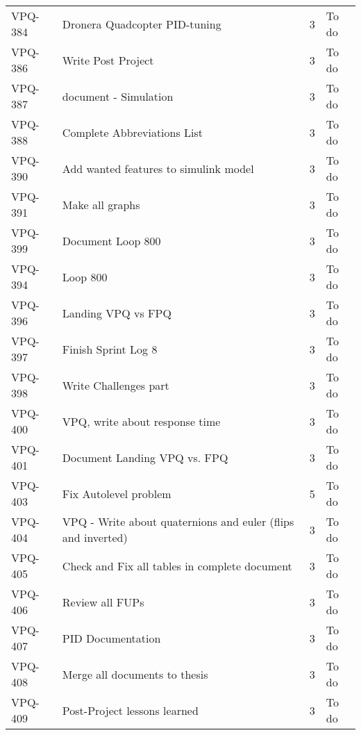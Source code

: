 \begin{table}[ht]
\begin{tabularx}{\linewidth}{|m{1.5cm} m{8.3cm} m{1.5cm} m{3.5cm}|}
      VPQ-384 & Dronera Quadcopter PID-tuning & 3\centering & To do  \\
\rowcolor{gainsboro}  VPQ-386 & Write Post Project & 3\centering & To do  \\
      VPQ-387 & document - Simulation & 3\centering & To do  \\
\rowcolor{gainsboro}  VPQ-388 & Complete Abbreviations List & 3\centering & To do  \\
      VPQ-390 & Add wanted features to simulink model & 3\centering & To do  \\
\rowcolor{gainsboro}  VPQ-391 & Make all graphs & 3\centering & To do  \\
      VPQ-399 & Document Loop 800 & 3\centering & To do  \\
\rowcolor{gainsboro}  VPQ-394 & Loop 800 & 3\centering & To do  \\
      VPQ-396 & Landing VPQ vs FPQ & 3\centering & To do  \\
\rowcolor{gainsboro}  VPQ-397 & Finish Sprint Log 8 & 3\centering & To do  \\
      VPQ-398 & Write Challenges part & 3\centering & To do  \\
\rowcolor{gainsboro}  VPQ-400 & VPQ, write about response time & 3\centering & To do  \\
      VPQ-401 & Document Landing VPQ vs. FPQ & 3\centering & To do  \\
\rowcolor{gainsboro}  VPQ-403 & Fix Autolevel problem & 5\centering & To do  \\
      VPQ-404 & VPQ - Write about quaternions and euler (flips and inverted) & 3\centering & To do  \\
\rowcolor{gainsboro}  VPQ-405 & Check and Fix all tables in complete document & 3\centering & To do  \\
      VPQ-406 & Review all FUPs & 3\centering & To do  \\
\rowcolor{gainsboro}  VPQ-407 & PID Documentation & 3\centering & To do  \\
      VPQ-408 & Merge all documents to thesis & 3\centering & To do  \\
\rowcolor{gainsboro}  VPQ-409 & Post-Project lessons learned & 3\centering & To do  \\
\hline    
\end{tabularx}
\end{table}



